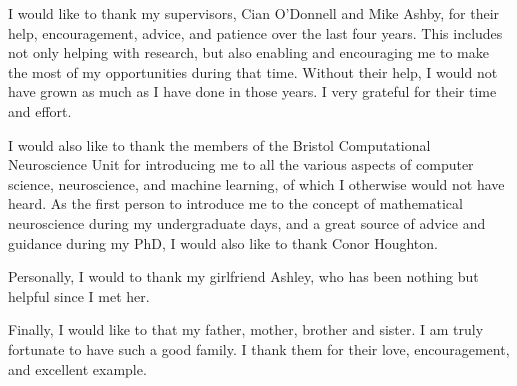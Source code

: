\documentclass[
11pt, %
english, %
onehalfspacing, %
headsepline, %
]{MastersDoctoralThesis} %
\begin{document}
\cleardoublepage


%
%


\begin{acknowledgements}
\addchaptertocentry{\acknowledgementname} %
I would like to thank my supervisors, Cian O'Donnell and Mike Ashby, for their help, encouragement, advice, and patience over the last four years. This includes not only helping with research, but also enabling and encouraging me to make the most of my opportunities during that time. Without their help, I would not have grown as much as I have done in those years. I very grateful for their time and effort.

I would also like to thank the members of the Bristol Computational Neuroscience Unit for introducing me to all the various aspects of computer science, neuroscience, and machine learning, of which I otherwise would not have heard. As the first person to introduce me to the concept of mathematical neuroscience during my undergraduate days, and a great source of advice and guidance during my PhD, I would also like to thank Conor Houghton.

Personally, I would to thank my girlfriend Ashley, who has been nothing but helpful since I met her.

Finally, I would like to that my father, mother, brother and sister. I am truly fortunate to have such a good family. I thank them for their love, encouragement, and excellent example.
\end{acknowledgements}

\end{document}
